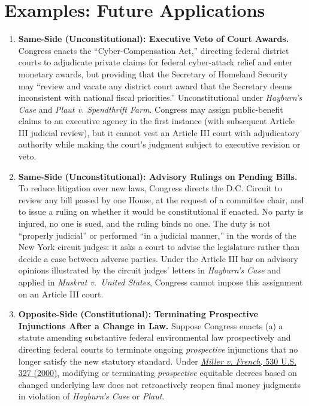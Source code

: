 \documentclass[12pt]{article}
\begin{document}
\section{Examples: Future Applications}
\begin{enumerate}

\item \textbf{Same-Side (Unconstitutional): Executive Veto of Court Awards.} Congress enacts the ``Cyber-Compensation Act,'' directing federal district courts to adjudicate private claims for federal cyber-attack relief and enter monetary awards, but providing that the Secretary of Homeland Security may ``review and vacate any district court award that the Secretary deems inconsistent with national fiscal priorities.'' Unconstitutional under \textit{Hayburn's Case} and \textit{Plaut v. Spendthrift Farm}. Congress may assign public-benefit claims to an executive agency in the first instance (with subsequent Article III judicial review), but it cannot vest an Article III court with adjudicatory authority while making the court's judgment subject to executive revision or veto.

\item \textbf{Same-Side (Unconstitutional): Advisory Rulings on Pending Bills.} To reduce litigation over new laws, Congress directs the D.C. Circuit to review any bill passed by one House, at the request of a committee chair, and to issue a ruling on whether it would be constitutional if enacted. No party is injured, no one is sued, and the ruling binds no one. The duty is not ``properly judicial'' or performed ``in a judicial manner,'' in the words of the New York circuit judges: it asks a court to advise the legislature rather than decide a case between adverse parties. Under the Article III bar on advisory opinions illustrated by the circuit judges' letters in \textit{Hayburn's Case} and applied in \textit{Muskrat v.\ United States}, Congress cannot impose this assignment on an Article III court.

\item \textbf{Opposite-Side (Constitutional): Terminating Prospective Injunctions After a Change in Law.} Suppose Congress enacts (a) a statute amending substantive federal environmental law prospectively and directing federal courts to terminate ongoing \textit{prospective} injunctions that no longer satisfy the new statutory standard. Under \href{https://www.law.cornell.edu/supremecourt/text/99-224}{\textit{Miller v. French}, 530 U.S. 327 (2000)}, modifying or terminating \textit{prospective} equitable decrees based on changed underlying law does not retroactively reopen final money judgments in violation of \textit{Hayburn's Case} or \textit{Plaut}.


\end{enumerate}
\end{document}
